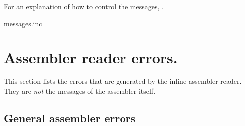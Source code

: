For an explanation of how to control the messages, .

\ifx\HCode\undefined
{}
\fi
 {messages.inc}

\section{Assembler reader errors.}

This section lists the errors that are generated by the inline assembler reader.
They are {\em not} the messages of the assembler itself.

\subsection{General assembler errors}
